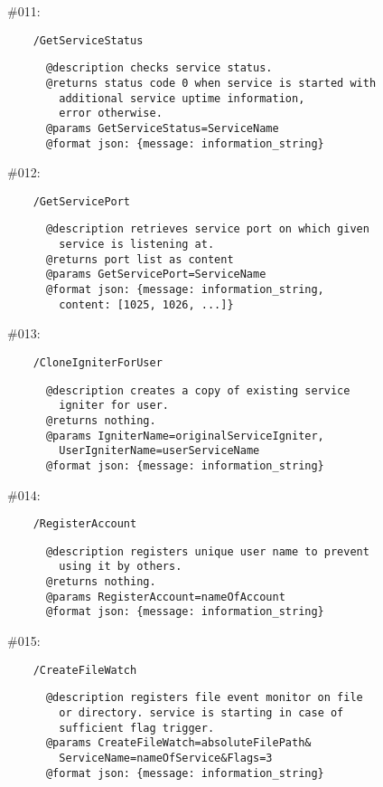 \documentclass[11pt]{scrartcl}
\begin{document}
\begin{description}
    \item \#011:
      \begin{verbatim}
    /GetServiceStatus
      \end{verbatim}
      \begin{verbatim}
      @description checks service status.
      @returns status code 0 when service is started with
        additional service uptime information,
        error otherwise.
      @params GetServiceStatus=ServiceName
      @format json: {message: information_string}
      \end{verbatim}

    \item \#012:
      \begin{verbatim}
    /GetServicePort
      \end{verbatim}
      \begin{verbatim}
      @description retrieves service port on which given
        service is listening at.
      @returns port list as content
      @params GetServicePort=ServiceName
      @format json: {message: information_string,
        content: [1025, 1026, ...]}
      \end{verbatim}

    \item \#013:
      \begin{verbatim}
    /CloneIgniterForUser
      \end{verbatim}
      \begin{verbatim}
      @description creates a copy of existing service
        igniter for user.
      @returns nothing.
      @params IgniterName=originalServiceIgniter,
        UserIgniterName=userServiceName
      @format json: {message: information_string}
      \end{verbatim}

    \item \#014:
      \begin{verbatim}
    /RegisterAccount
      \end{verbatim}
      \begin{verbatim}
      @description registers unique user name to prevent
        using it by others.
      @returns nothing.
      @params RegisterAccount=nameOfAccount
      @format json: {message: information_string}
      \end{verbatim}

    \item \#015:
      \begin{verbatim}
    /CreateFileWatch
      \end{verbatim}
      \begin{verbatim}
      @description registers file event monitor on file
        or directory. service is starting in case of
        sufficient flag trigger.
      @params CreateFileWatch=absoluteFilePath&
        ServiceName=nameOfService&Flags=3
      @format json: {message: information_string}
      \end{verbatim}


\end{description}
\end{document}
